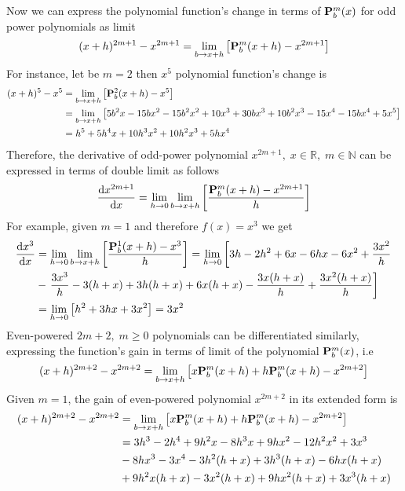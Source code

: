 Now we can express the polynomial function's change in terms of ${\mathbf{P}}\sp{m} \sb{b}(x)$ for odd power polynomials
as limit
\[
    (x+h)^{2m+1} - x^{2m+1} = \lim_{b \to x+h} \left[ {\mathbf{P}}\sp{m} \sb{b}(x+h) - x^{2m+1} \right]
\]
For instance, let be $m=2$ then $x^5$ polynomial function's change is
\begin{equation*}
    \begin{split}
    (x+h)
        ^{5} - x^{5} &= \lim_{b \to x+h} \left[ {\mathbf{P}}\sp{2} \sb{b}(x+h) - x^{5} \right] \\
        &= \lim_{b \to x+h} \left[ 5 b^2 x - 15 b x^2 - 15 b^2 x^2 + 10 x^3 + 30 b x^3 + 10 b^2 x^3 - 15 x^4 - 15 b x^4 + 5 x^5 \right] \\
        &= h^5 + 5 h^4 x + 10 h^3 x^2 + 10 h^2 x^3 + 5 h x^4
    \end{split}
\end{equation*}
Therefore, the derivative of odd-power polynomial $x^{2m+1}, \; x\in\mathbb{R}, \; m\in\mathbb{N}$ can be expressed in terms of double limit as follows
\begin{equation}
    \odv{x^{2m+1}}{x} = \lim_{h \to 0} \lim_{b \to x+h} \left[ \frac{\polynomialP{m}{b}{x+h} - x^{2m+1}}{h} \right] \label{eq:odd-power-derivative}
\end{equation}
For example, given $m=1$ and therefore $f(x) = x^3$ we get
\begin{equation*}
    \begin{split}
        \odv{x^3}{x}
        &=\lim_{h \to 0} \lim_{b \to x+h} \left[ \frac{\polynomialP{1}{b}{x+h} - x^{3}}{h} \right]
        = \lim_{h \to 0} \left[ 3 h - 2 h^2 + 6 x - 6 h x - 6 x^2 + \frac{3 x^2}{h} \right. \\
        &- \left.\frac{3 x^3}{h} - 3 (h + x) + 3 h (h + x) + 6 x (h + x)- \frac{3 x (h + x)}{h} + \frac{3 x^2 (h + x)}{h} \right] \\
        &=\lim_{h \to 0} \left[ h^2 + 3 h x + 3 x^2 \right] = 3x^2
    \end{split}
\end{equation*}
Even-powered $2m+2, \; m\geq 0$ polynomials can be differentiated similarly, expressing the function's gain in terms
of limit of the polynomial ${\mathbf{P}}\sp{m} \sb{b}(x)$, i.e
\[
    (x+h)^{2m+2} - x^{2m+2} = \lim_{b \to x+h} \left[ x{\mathbf{P}}\sp{m} \sb{b}(x+h) + h{\mathbf{P}}\sp{m} \sb{b}(x+h)  - x^{2m+2} \right]
\]
Given $m=1$, the gain of even-powered polynomial $x^{2m+2}$ in its extended form is
\begin{equation*}
    \begin{split}
    (x+h)
        ^{2m+2} - x^{2m+2}
        &= \lim_{b \to x+h} \left[ x{\mathbf{P}}\sp{m} \sb{b}(x+h) + h{\mathbf{P}}\sp{m} \sb{b}(x+h)  - x^{2m+2} \right] \\
        &= 3 h^3 - 2 h^4 + 9 h^2 x - 8 h^3 x + 9 h x^2 - 12 h^2 x^2 + 3 x^3 \\
        &- 8 h x^3 - 3 x^4 - 3 h^2 (h + x) + 3 h^3 (h + x) - 6 h x (h + x) \\
        &+ 9 h^2 x (h + x) - 3 x^2 (h + x) + 9 h x^2 (h + x) + 3 x^3 (h + x)
    \end{split}
\end{equation*}
